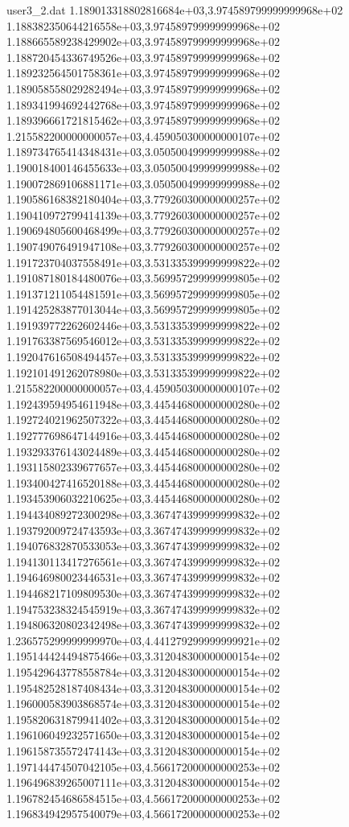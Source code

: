\begin{filecontents}{user3_2.dat}
1.189013318802816684e+03,3.974589799999999968e+02
1.188382350644216558e+03,3.974589799999999968e+02
1.188665589238429902e+03,3.974589799999999968e+02
1.188720454336749526e+03,3.974589799999999968e+02
1.189232564501758361e+03,3.974589799999999968e+02
1.189058558029282494e+03,3.974589799999999968e+02
1.189341994692442768e+03,3.974589799999999968e+02
1.189396661721815462e+03,3.974589799999999968e+02
1.215582200000000057e+03,4.459050300000000107e+02
1.189734765414348431e+03,3.050500499999999988e+02
1.190018400146455633e+03,3.050500499999999988e+02
1.190072869106881171e+03,3.050500499999999988e+02
1.190586168382180404e+03,3.779260300000000257e+02
1.190410972799414139e+03,3.779260300000000257e+02
1.190694805600468499e+03,3.779260300000000257e+02
1.190749076491947108e+03,3.779260300000000257e+02
1.191723704037558491e+03,3.531335399999999822e+02
1.191087180184480076e+03,3.569957299999999805e+02
1.191371211054481591e+03,3.569957299999999805e+02
1.191425283877013044e+03,3.569957299999999805e+02
1.191939772262602446e+03,3.531335399999999822e+02
1.191763387569546012e+03,3.531335399999999822e+02
1.192047616508494457e+03,3.531335399999999822e+02
1.192101491262078980e+03,3.531335399999999822e+02
1.215582200000000057e+03,4.459050300000000107e+02
1.192439594954611948e+03,3.445446800000000280e+02
1.192724021962507322e+03,3.445446800000000280e+02
1.192777698647144916e+03,3.445446800000000280e+02
1.193293376143024489e+03,3.445446800000000280e+02
1.193115802339677657e+03,3.445446800000000280e+02
1.193400427416520188e+03,3.445446800000000280e+02
1.193453906032210625e+03,3.445446800000000280e+02
1.194434089272300298e+03,3.367474399999999832e+02
1.193792009724743593e+03,3.367474399999999832e+02
1.194076832870533053e+03,3.367474399999999832e+02
1.194130113417276561e+03,3.367474399999999832e+02
1.194646980023446531e+03,3.367474399999999832e+02
1.194468217109809530e+03,3.367474399999999832e+02
1.194753238324545919e+03,3.367474399999999832e+02
1.194806320802342498e+03,3.367474399999999832e+02
1.236575299999999970e+03,4.441279299999999921e+02
1.195144424494875466e+03,3.312048300000000154e+02
1.195429643778558784e+03,3.312048300000000154e+02
1.195482528187408434e+03,3.312048300000000154e+02
1.196000583903868574e+03,3.312048300000000154e+02
1.195820631879941402e+03,3.312048300000000154e+02
1.196106049232571650e+03,3.312048300000000154e+02
1.196158735572474143e+03,3.312048300000000154e+02
1.197144474507042105e+03,4.566172000000000253e+02
1.196496839265007111e+03,3.312048300000000154e+02
1.196782454686584515e+03,4.566172000000000253e+02
1.196834942957540079e+03,4.566172000000000253e+02

\end{filecontents}
